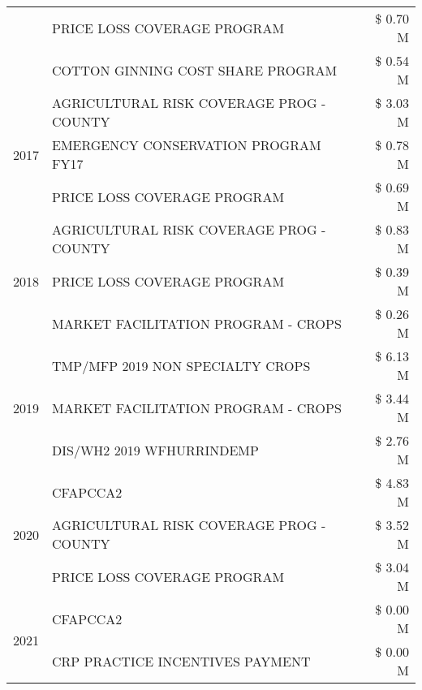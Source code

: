 \begin{tabular}{llr}
 & PRICE LOSS COVERAGE PROGRAM & \$ 0.70 M \\
 & COTTON GINNING COST SHARE PROGRAM & \$ 0.54 M \\
\cline{1-3}
\multirow[t]{3}{*}{2017} & AGRICULTURAL RISK COVERAGE PROG - COUNTY & \$ 3.03 M \\
 & EMERGENCY CONSERVATION PROGRAM FY17 & \$ 0.78 M \\
 & PRICE LOSS COVERAGE PROGRAM & \$ 0.69 M \\
\cline{1-3}
\multirow[t]{3}{*}{2018} & AGRICULTURAL RISK COVERAGE PROG - COUNTY & \$ 0.83 M \\
 & PRICE LOSS COVERAGE PROGRAM & \$ 0.39 M \\
 & MARKET FACILITATION PROGRAM - CROPS & \$ 0.26 M \\
\cline{1-3}
\multirow[t]{3}{*}{2019} & TMP/MFP 2019 NON SPECIALTY CROPS & \$ 6.13 M \\
 & MARKET FACILITATION PROGRAM - CROPS & \$ 3.44 M \\
 & DIS/WH2 2019 WFHURRINDEMP & \$ 2.76 M \\
\cline{1-3}
\multirow[t]{3}{*}{2020} & CFAPCCA2 & \$ 4.83 M \\
 & AGRICULTURAL RISK COVERAGE PROG - COUNTY & \$ 3.52 M \\
 & PRICE LOSS COVERAGE PROGRAM & \$ 3.04 M \\
\cline{1-3}
\multirow[t]{2}{*}{2021} & CFAPCCA2 & \$ 0.00 M \\
 & CRP PRACTICE INCENTIVES PAYMENT & \$ 0.00 M \\
\cline{1-3}
\bottomrule
\end{tabular}
